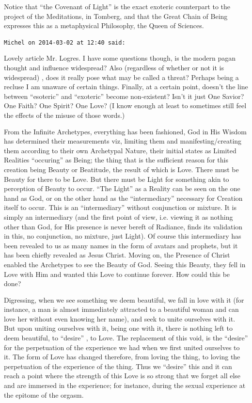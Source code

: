 \begin{footnotesize}
\begin{sffamily}
Notice that ``the Covenant of Light'' is the exact exoteric counterpart to the project of the Meditations, in Tomberg, and that the Great Chain of Being expresses this as a metaphysical Philosophy, the Queen of Sciences.

\hfill

\texttt{Michel on 2014-03-02 at 12:40 said:}

Lovely article Mr. Logres. I have some questions though, is the modern pagan thought and influence widespread? Also (regardless of whether or not it is widespread) , does it really pose what may be called a threat? Perhaps being a recluse I am unaware of certain things. Finally, at a certain point, doesn't the line between ``esoteric'' and ``exoteric'' become non-existent? Isn't it just One Savior? One Faith? One Spirit? One Love? (I know enough at least to sometimes still feel the effects of the misuse of those words.)

From the Infinite Archetypes, everything has been fashioned, God in His Wisdom has determined their measurements viz, limiting them and manifesting/creating them according to their own Archetypal Nature, their initial states as Limited Realities ``occuring'' as Being; the thing that is the sufficient reason for this creation being Beauty or Beatitude, the result of which is Love. There must be Beauty for there to be Love. But there must be Light for something akin to perception of Beauty to occur. ``The Light'' as a Reality can be seen on the one hand as God, or on the other hand as the ``intermediary'' necessary for Creation itself to occur. This is an ``intermediary'' without conjunction or mixture. It is simply an intermediary (and the first point of view, i.e. viewing it as nothing other than God, for His presence is never bereft of Radiance, finds its validation in this, no conjunction, no mixture, just Light). Of course this intermediary has been revealed to us as many names in the form of avatars and prophets, but it has been chiefly revealed as Jesus Christ. Moving on, the Presence of Christ enabled the Archetypes to see the Beauty of God. Seeing this Beauty, they fell in Love with Him and wanted this Love to continue forever. How could this be done? 

Digressing, when we see something we deem beautiful, we fall in love with it (for instance, a man is almost immediately attracted to a beautiful woman and can love her without even knowing her name), and seek to unite ourselves with it. But upon uniting ourselves with it, being one with it, there is nothing left to deem beautiful, to ``desire'' , to Love. The replacement of this void, is the ``desire'' for the perpetuation of the experience we had when we first united ourselves to it. The form of Love has changed therefore, from loving the thing, to loving the perpetuation of the experience of the thing. Thus we ``desire'' this and it can reach a point where the strength of this Love is so strong that we forget all else and are immersed in the experience; for instance, during the sexual experience at the epitome of the orgasm.


\end{sffamily}
\end{footnotesize}
